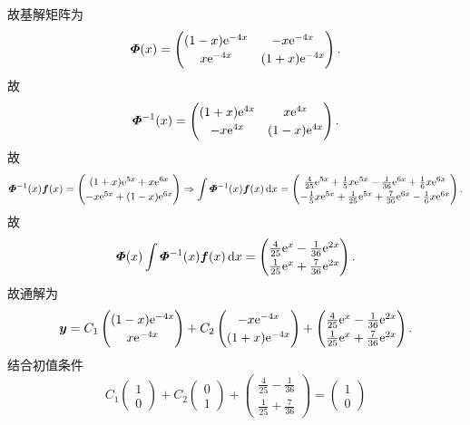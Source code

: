 \begin{solution}
  故基解矩阵为
  \[\bmitPhi(x)=\begin{pmatrix}(1-x)\e^{-4x}&-x\e^{-4x}\\x\e^{-4x}&(1+x)\e^{-4x}\end{pmatrix}.\]
  故
  \[\bmitPhi^{-1}(x)=\begin{pmatrix}(1+x)\e^{4x}&x\e^{4x}\\-x\e^{4x}&(1-x)\e^{4x}\end{pmatrix}.\]
  故
  \[\bmitPhi^{-1}(x)\bm{f}(x)=\begin{pmatrix}(1+x)\e^{5x}+x\e^{6x}\\-x\e^{5x}+(1-x)\e^{6x}\end{pmatrix}\Rightarrow\int\bmitPhi^{-1}(x)\bm{f}(x)\diff x=
  \renewcommand\arraystretch{1.2}\begin{pmatrix}\frac{4}{25}\e^{5x}+\frac{1}{5}x\e^{5x}-\frac{1}{36}\e^{6x}+\frac{1}{6}x\e^{6x}\\-\frac{1}{5}x\e^{5x}+\frac{1}{25}\e^{5x}+\frac{7}{36}\e^{6x}-\frac{1}{6}x\e^{6x}\end{pmatrix}.\]
  故
  \[\bmitPhi(x)\int\bmitPhi^{-1}(x)\bm{f}(x)\diff x=
  \renewcommand\arraystretch{1.2}\begin{pmatrix}\frac{4}{25}\e^x-\frac{1}{36}\e^{2x}\\\frac{1}{25}\e^x+\frac{7}{36}\e^{2x}\end{pmatrix}.\]
  故通解为
  \[\bm{y}=C_1\begin{pmatrix}(1-x)\e^{-4x}\\x\e^{-4x}\end{pmatrix}+C_2\begin{pmatrix}-x\e^{-4x}\\(1+x)\e^{-4x}\end{pmatrix}+\renewcommand\arraystretch{1.2}\begin{pmatrix}\frac{4}{25}\e^x-\frac{1}{36}\e^{2x}\\\frac{1}{25}\e^x+\frac{7}{36}\e^{2x}\end{pmatrix}.\]
  结合初值条件
  \[C_1\begin{pmatrix}1\\0\end{pmatrix}+C_2\begin{pmatrix}0\\1\end{pmatrix}+\begin{pmatrix}\frac{4}{25}-\frac{1}{36}\\\frac{1}{25}+\frac{7}{36}\end{pmatrix}=\begin{pmatrix}1\\0\end{pmatrix}\]

\end{solution}
